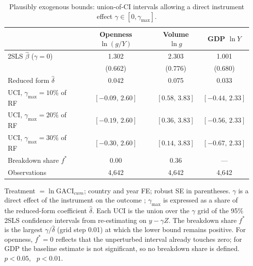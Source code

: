 \begin{table}[H]
\centering
\caption{Plausibly exogenous bounds: union-of-CI intervals allowing a direct
instrument effect $\gamma\in[0,\gamma_{\max}]$.}
\label{tab:conley}
\begin{threeparttable}
\small
\begin{tabular}{lccc}
\toprule
 & Openness $\ln(g/Y)$ & Volume $\ln g$ & GDP $\ln Y$ \\
\midrule
2SLS $\hat\beta$ ($\gamma=0$)   & 1.302\sym{**} & 2.303\sym{***} & 1.001 \\
                                & (0.662)       & (0.776)        & (0.680) \\
Reduced form $\hat\delta$       & 0.042         & 0.075          & 0.033 \\
\addlinespace
UCI, $\gamma_{\max}=10\%$ of RF & $[-0.09,\,2.60]$ & $[0.58,\,3.83]$ & $[-0.44,\,2.33]$ \\
UCI, $\gamma_{\max}=20\%$ of RF & $[-0.19,\,2.60]$ & $[0.36,\,3.83]$ & $[-0.56,\,2.33]$ \\
UCI, $\gamma_{\max}=30\%$ of RF & $[-0.30,\,2.60]$ & $[0.14,\,3.83]$ & $[-0.67,\,2.33]$ \\
Breakdown share $f^{*}$         & 0.00          & 0.36           & --- \\
\midrule
Observations                    & 4{,}642       & 4{,}642        & 4{,}642 \\
\bottomrule
\end{tabular}
\begin{tablenotes}\small
\item Treatment $=\ln\mathrm{GACI}_{cwm}$; country and year FE; robust SE in
parentheses. $\gamma$ is a direct effect of the instrument on the outcome
\citep{Conley_2012}; $\gamma_{\max}$ is expressed as a share of the
reduced-form coefficient $\hat\delta$. Each UCI is the union over the
$\gamma$ grid of the 95\% 2SLS confidence intervals from re-estimating on
$y-\gamma Z$. The breakdown share $f^{*}$ is the largest $\gamma/\hat\delta$
(grid step 0.01) at which the lower bound remains positive. For openness,
$f^{*}=0$ reflects that the unperturbed interval already touches zero; for
GDP the baseline estimate is not significant, so no breakdown share is
defined.
\sym{**}~$p<0.05$, \sym{***}~$p<0.01$.
\end{tablenotes}
\end{threeparttable}
\end{table}

